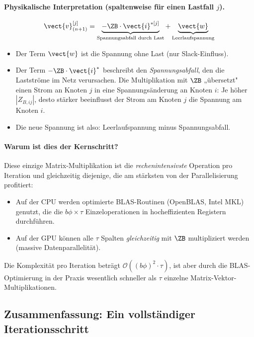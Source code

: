 \paragraph{Physikalische Interpretation (spaltenweise für einen Lastfall $j$).}
\begin{equation}
	\vect{v}_{(n+1)}^{[j]} = \underbrace{-\ZB \cdot \vect{i}^{*[j]}}_{\text{Spannungsabfall durch Last}} + \underbrace{\vect{w}}_{\text{Leerlaufspannung}}
	\label{eq:interpretation_spalte}
\end{equation}

\begin{itemize}
	\item Der Term $\vect{w}$ ist die Spannung ohne Last (nur Slack-Einfluss).
	\item Der Term $-\ZB \cdot \vect{i}^*$ beschreibt den \textit{Spannungsabfall}, den die Lastströme im Netz verursachen. Die Multiplikation mit $\ZB$ „übersetzt" einen Strom an Knoten $j$ in eine Spannungsänderung an Knoten $i$: Je höher $|Z_{B,ij}|$, desto stärker beeinflusst der Strom am Knoten $j$ die Spannung am Knoten $i$.
	\item Die neue Spannung ist also: Leerlaufspannung minus Spannungsabfall.
\end{itemize}

\paragraph{Warum ist dies der Kernschritt?} Diese einzige Matrix-Multiplikation ist die \textit{rechenintensivste} Operation pro Iteration und gleichzeitig diejenige, die am stärksten von der Parallelisierung profitiert:
\begin{itemize}
	\item Auf der CPU werden optimierte BLAS-Routinen (OpenBLAS, Intel MKL) genutzt, die die $b\phi \times \tau$ Einzeloperationen in hocheffizienten Registern durchführen.
	\item Auf der GPU können alle $\tau$ Spalten \textit{gleichzeitig} mit $\ZB$ multipliziert werden (massive Datenparallelität).
\end{itemize}

Die Komplexität pro Iteration beträgt $\mathcal{O}((b\phi)^2 \cdot \tau)$, ist aber durch die BLAS-Optimierung in der Praxis wesentlich schneller als $\tau$ einzelne Matrix-Vektor-Multiplikationen.

\subsection{Zusammenfassung: Ein vollständiger Iterationsschritt}
\label{subsec:iteration_zusammenfassung}

